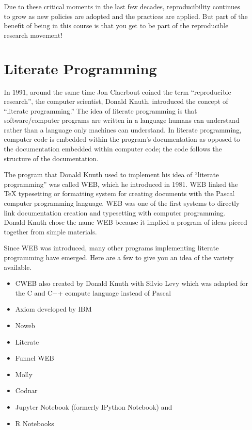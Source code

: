 \documentclass[
]{book}
\providecommand{\tightlist}{%
  \setlength{\itemsep}{0pt}\setlength{\parskip}{0pt}}
\begin{document}
Due to these critical moments in the last few decades, reproducibility continues to grow as new policies are adopted and the practices are applied. But part of the benefit of being in this course is that you get to be part of the reproducible research movement!

\hypertarget{literate-programming}{%
\section{Literate Programming}\label{literate-programming}}

In 1991, around the same time Jon Claerbout coined the term ``reproducible research'', the computer scientist, Donald Knuth, introduced the concept of ``literate programming.'' The idea of literate programming is that software/computer programs are written in a language humans can understand rather than a language only machines can understand. In literate programming, computer code is embedded within the program's documentation as opposed to the documentation embedded within computer code; the code follows the structure of the documentation.

The program that Donald Knuth used to implement his idea of ``literate programming'' was called WEB, which he introduced in 1981. WEB linked the TeX typesetting or formatting system for creating documents with the Pascal computer programming language. WEB was one of the first systems to directly link documentation creation and typesetting with computer programming. Donald Knuth chose the name WEB because it implied a program of ideas pieced together from simple materials.

Since WEB was introduced, many other programs implementing literate programming have emerged. Here are a few to give you an idea of the variety available.

\begin{itemize}
\tightlist
\item
  CWEB also created by Donald Knuth with Silvio Levy which was adapted for the C and C++ compute language instead of Pascal
\item
  Axiom developed by IBM
\item
  Noweb
\item
  Literate
\item
  Funnel WEB
\item
  Molly
\item
  Codnar
\item
  Jupyter Notebook (formerly IPython Notebook) and
\item
  R Notebooks
\end{itemize}
\end{document}
